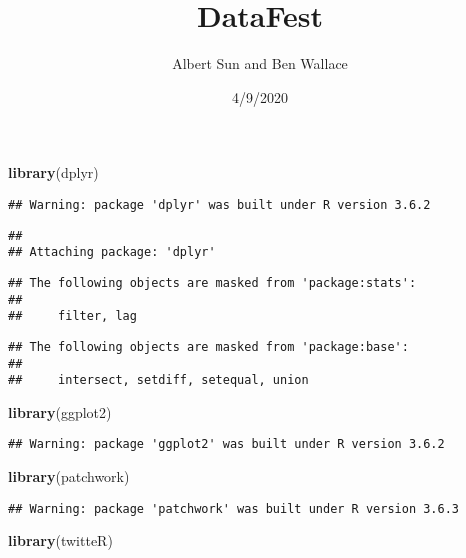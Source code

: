 \documentclass[
]{article}
\title{DataFest}
\author{Albert Sun and Ben Wallace}
\date{4/9/2020}
\newenvironment{Shaded}{\begin{snugshade}}{\end{snugshade}}
\newcommand{\KeywordTok}[1]{\textcolor[rgb]{0.13,0.29,0.53}{\textbf{#1}}}
\newcommand{\NormalTok}[1]{#1}
\begin{document}
\maketitle

\begin{Shaded}
\begin{Highlighting}[]
\KeywordTok{library}\NormalTok{(dplyr)}
\end{Highlighting}
\end{Shaded}

\begin{verbatim}
## Warning: package 'dplyr' was built under R version 3.6.2
\end{verbatim}

\begin{verbatim}
## 
## Attaching package: 'dplyr'
\end{verbatim}

\begin{verbatim}
## The following objects are masked from 'package:stats':
## 
##     filter, lag
\end{verbatim}

\begin{verbatim}
## The following objects are masked from 'package:base':
## 
##     intersect, setdiff, setequal, union
\end{verbatim}

\begin{Shaded}
\begin{Highlighting}[]
\KeywordTok{library}\NormalTok{(ggplot2)}
\end{Highlighting}
\end{Shaded}

\begin{verbatim}
## Warning: package 'ggplot2' was built under R version 3.6.2
\end{verbatim}

\begin{Shaded}
\begin{Highlighting}[]
\KeywordTok{library}\NormalTok{(patchwork)}
\end{Highlighting}
\end{Shaded}

\begin{verbatim}
## Warning: package 'patchwork' was built under R version 3.6.3
\end{verbatim}

\begin{Shaded}
\begin{Highlighting}[]
\KeywordTok{library}\NormalTok{(twitteR)}
\end{Highlighting}
\end{Shaded}
\end{document}
